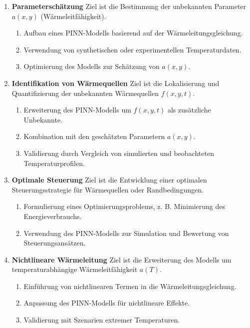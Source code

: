 \begin{enumerate}
	\item \textbf{Parameterschätzung}  
	Ziel ist die Bestimmung der unbekannten Parameter $a(x, y)$ (Wärmeleitfähigkeit).  
	\begin{enumerate}
		\item Aufbau eines PINN-Modells basierend auf der Wärmeleitungsgleichung.  
		\item Verwendung von synthetischen oder experimentellen Temperaturdaten.  
		\item Optimierung des Modells zur Schätzung von $a(x, y)$.  
	\end{enumerate}
	
	\item \textbf{Identifikation von Wärmequellen}  
	Ziel ist die Lokalisierung und Quantifizierung der unbekannten Wärmequellen $f(x, y, t)$.  
	\begin{enumerate}
		\item Erweiterung des PINN-Modells um $f(x, y, t)$ als zusätzliche Unbekannte.  
		\item Kombination mit den geschätzten Parametern $a(x, y)$.  
		\item Validierung durch Vergleich von simulierten und beobachteten Temperaturprofilen.  
	\end{enumerate}
	
	\item \textbf{Optimale Steuerung}  
	Ziel ist die Entwicklung einer optimalen Steuerungsstrategie für Wärmequellen oder Randbedingungen.  
	\begin{enumerate}
		\item Formulierung eines Optimierungsproblems, z. B. Minimierung des Energieverbrauchs.  
		\item Verwendung des PINN-Modells zur Simulation und Bewertung von Steuerungsansätzen.  
	\end{enumerate}
	
	\item \textbf{Nichtlineare Wärmeleitung}  
	Ziel ist die Erweiterung des Modells um temperaturabhängige Wärmeleitfähigkeit $a(T)$.  
	\begin{enumerate}
		\item Einführung von nichtlinearen Termen in die Wärmeleitungsgleichung.  
		\item Anpassung des PINN-Modells für nichtlineare Effekte.  
		\item Validierung mit Szenarien extremer Temperaturen.  
	\end{enumerate}
	

\end{enumerate}
